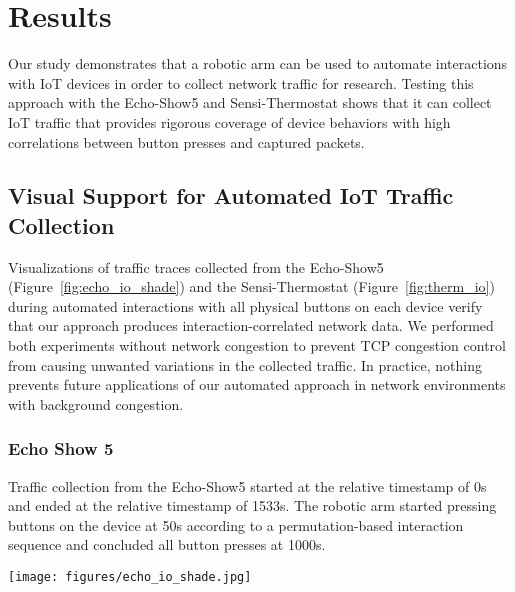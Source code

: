 \section{Results}
\label{sec:evaluation}

Our study demonstrates that a robotic arm can be used to automate interactions with IoT devices in order to collect network traffic for research. Testing this approach with the Echo-Show5 and Sensi-Thermostat shows that it can collect IoT traffic that provides rigorous coverage of device behaviors with high correlations between button presses and captured packets.

\subsection{Visual Support for Automated IoT Traffic Collection}
\label{sec:results-visual}
Visualizations of traffic traces collected from the Echo-Show5 (Figure~\ref{fig:echo_io_shade}) and the Sensi-Thermostat (Figure~\ref{fig:therm_io}) during automated interactions with all physical buttons on each device verify that our approach produces interaction-correlated network data. We performed both experiments without network congestion to prevent TCP congestion control from causing unwanted variations in the collected traffic. In practice, nothing prevents future applications of our automated approach in network environments with background congestion.

\subsubsection{Echo Show 5} Traffic collection from the Echo-Show5 started at the relative timestamp of 0s and ended at the relative timestamp of 1533s. The robotic arm started pressing buttons on the device at 50s according to a permutation-based interaction sequence and concluded all button presses at 1000s.

\begin{figure*}[t]
    \centering
    \texttt{[image: figures/echo\_io\_shade.jpg]}
    \caption{Example Echo-Show5 TCP traffic showing significantly more packets during automated robotic arm interactions. This packet trace was collected over 1533 seconds using a permutation-based interaction sequence (Section~\ref{sec:interaction-seqs}) with 10 seconds between each interaction. The device sent and received 8.83 packets per second on average during the automated button presses and 2.25 packets per second on average after the automated interactions (idle time)}
    \label{fig:echo_io_shade}
\end{figure*}

